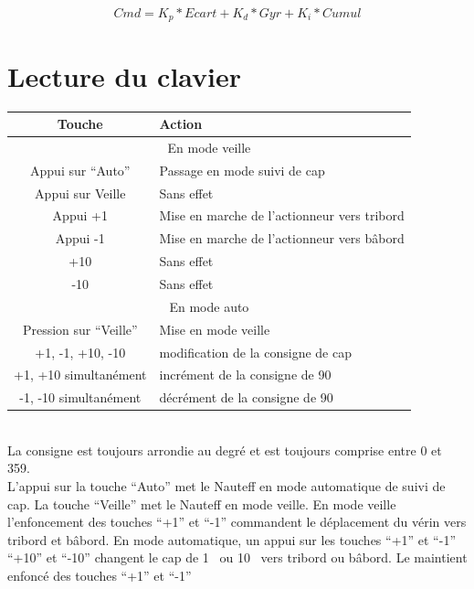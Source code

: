 \documentclass[a4paper,11pt]{report}
\begin{document}
\begin{equation}
	\label{eq:calculPID}
	Cmd = K_p * Ecart + K_d * Gyr + K_i * Cumul
\end{equation}

\section{Lecture du clavier}

\begin{tabular}{|c|p{6cm} |}
	\hline
	 Touche & Action  \\ \hline
	\multicolumn{2}{|c|}{En mode veille} \\ \hline
	 Appui sur ``Auto'' & Passage en mode suivi de cap\\ \hline
	 Appui sur Veille & Sans effet \\ \hline
	 Appui +1 &  Mise en marche de l'actionneur vers tribord \\ \hline
	 Appui -1 &  Mise en marche de l'actionneur vers bâbord \\ \hline
	 +10 & Sans effet     \\ \hline
	 -10 &  Sans effet    \\ \hline
	\multicolumn{2}{|c|}{En mode auto} \\ \hline
	Pression sur ``Veille'' & Mise en mode veille     \\ \hline
	+1, -1, +10, -10 & modification de la consigne de cap     \\ \hline
	+1, +10 simultanément &  incrément de la consigne de 90\degres    \\
	-1, -10 simultanément &  décrément de la consigne de 90\degres    \\ 
	 \hline
\end{tabular} 
\\

La consigne est toujours arrondie au degré
et est toujours comprise entre 0 et 359\degres.
\\

L'appui sur la touche ``Auto'' met le Nauteff en mode automatique de suivi de cap.
La touche ``Veille'' met le Nauteff en mode veille.
En mode veille l'enfoncement des touches ``+1'' et ``-1'' commandent le déplacement du vérin vers tribord et bâbord.
En mode automatique, un appui sur les touches ``+1'' et ``-1'' ``+10'' et ``-10''
changent le cap de 1\degres~ ou 10\degres~ vers tribord ou bâbord.
Le maintient enfoncé des touches ``+1'' et ``-1''
\end{document}
